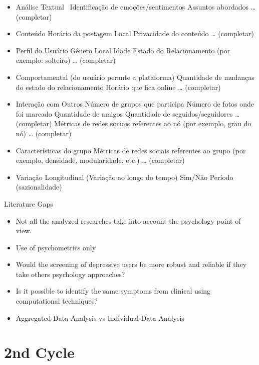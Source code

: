\documentclass[aspectratio=169,10pt,xcolor={dvipsnames}]{beamer}
\begin{document}
\begin{frame}
  \begin{itemize}
    \item Análise Textual
      \ Identificação de emoções/sentimentos
    Assuntos abordados
    … (completar)
    \item Conteúdo
    Horário da postagem
    Local
    Privacidade do conteúdo
    … (completar)
    \item Perfil do Usuário
    Gênero
    Local
    Idade
    Estado do Relacionamento (por exemplo: solteiro)
    … (completar)
    \item Comportamental (do usuário perante a plataforma)
    Quantidade de mudanças do estado do relacionamento
    Horário que fica online
    … (completar)
    \item Interação com Outros
    Número de grupos que participa
    Número de fotos onde foi marcado
    Quantidade de amigos 
    Quantidade de seguidos/seguidores
    … (completar)
    Métricas de redes sociais referentes ao nó (por exemplo, grau do nó)
    … (completar)
    \item Características do grupo 
    Métricas de redes sociais referentes ao grupo (por exemplo, densidade, modularidade, etc.)
    … (completar)
    \item Variação Longitudinal (Variação ao longo do tempo)
    Sim/Não
    Período (sazionalidade)
    
  \end{itemize}
\end{frame}

\begin{frame}{Literature Gaps}
  \begin{itemize}
    \item Not all the analyzed researches take into account the psychology point of view. 
    \item Use of psychometrics only
    \item Would the screening of depressive users be more robust and reliable if they take others psychology approaches?
    \item Is it possible to identify the same symptoms from clinical using computational techniques?
    \item Aggregated Data Analysis vs Individual Data Analysis
  \end{itemize}
\end{frame}

\section{2nd Cycle}
\end{document}
